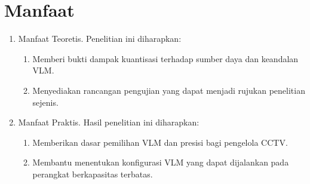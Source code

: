 \section{Manfaat}
\begin{enumerate}[label=\alph*., topsep=0pt, itemsep=0pt, partopsep=0pt, parsep=0pt]
  \item Manfaat Teoretis. Penelitian ini diharapkan:
  \begin{enumerate}[label=\arabic*., topsep=0pt, itemsep=0pt, partopsep=0pt, parsep=0pt]
    \item Memberi bukti dampak kuantisasi terhadap sumber daya dan keandalan VLM.
    \item Menyediakan rancangan pengujian yang dapat menjadi rujukan penelitian sejenis.
  \end{enumerate}

  \item Manfaat Praktis. Hasil penelitian ini diharapkan:
  \begin{enumerate}[label=\arabic*., topsep=0pt, itemsep=0pt, partopsep=0pt, parsep=0pt]
    \item Memberikan dasar pemilihan VLM dan presisi bagi pengelola CCTV.
    \item Membantu menentukan konfigurasi VLM yang dapat dijalankan pada perangkat berkapasitas terbatas.
  \end{enumerate}
\end{enumerate}